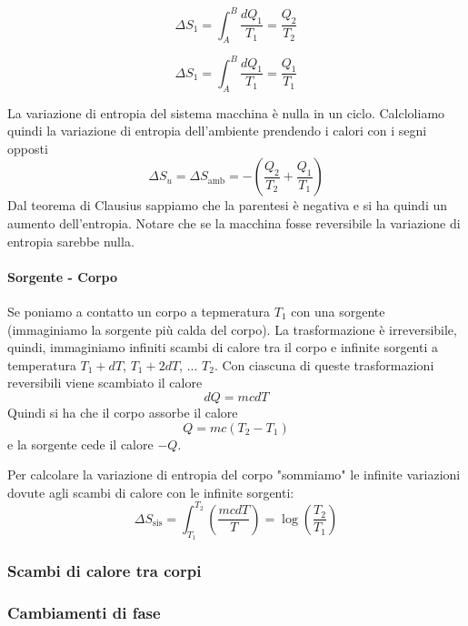 \documentclass[x11names]{report}
\begin{document}
\begin{minipage}{0.49\textwidth}
	\[ 
	\Delta S_{1} = \int_{A}^{B}\frac{dQ_{1}}{T_{1}} = \frac{Q_{2}}{T_{2}}
	\]
\end{minipage}
\begin{minipage}{0.49\textwidth}
	\[ 
	\Delta S_{1} = \int_{A}^{B}\frac{dQ_{1}}{T_{1}} = 
	\frac{Q_{1}}{T_{1}}
	\]
\end{minipage}
La variazione di entropia del sistema macchina è nulla in un ciclo. Calcloliamo quindi la variazione di entropia dell'ambiente prendendo i calori con i segni opposti
\[ 
\Delta S_{u} = \Delta S_{\text{amb}}  = -\left(\frac{Q_{2}}{T_{2}} + \frac{Q_{1}}{T_{1}}\right)
\]
Dal teorema di Clausius sappiamo che la parentesi è negativa e si ha quindi un aumento dell'entropia. Notare che se la macchina fosse reversibile la variazione di entropia sarebbe nulla.

\paragraph{Sorgente - Corpo}
Se poniamo a contatto un corpo a tepmeratura \(T_{1}\) con una sorgente (immaginiamo la sorgente più calda del corpo). La trasformazione è irreversibile, quindi, immaginiamo infiniti scambi di calore tra il corpo e infinite sorgenti a temperatura \(T_{1} + dT\), \(T_{1} + 2dT\), ... \(T_{2}\). Con ciascuna di queste trasformazioni reversibili viene scambiato il calore 
\[ 
dQ = mcdT 
\]
Quindi si ha che il corpo assorbe il calore
\[ 
Q = mc(T_{2} - T_{1})
\]
e la sorgente cede il calore \(-Q\). 

Per calcolare la variazione di entropia del corpo "sommiamo" le infinite variazioni dovute agli scambi di calore con le infinite sorgenti:
\[ 
\Delta S_{\text{sis}} = \int_{T_{1}}^{T_{2}}\left(\frac{mcdT}{T}\right) = \log\left(\frac{T_{2}}{T_{1}}\right)
\]


\subsubsection{Scambi di calore tra corpi}
\subsubsection{Cambiamenti di fase}
\end{document}

